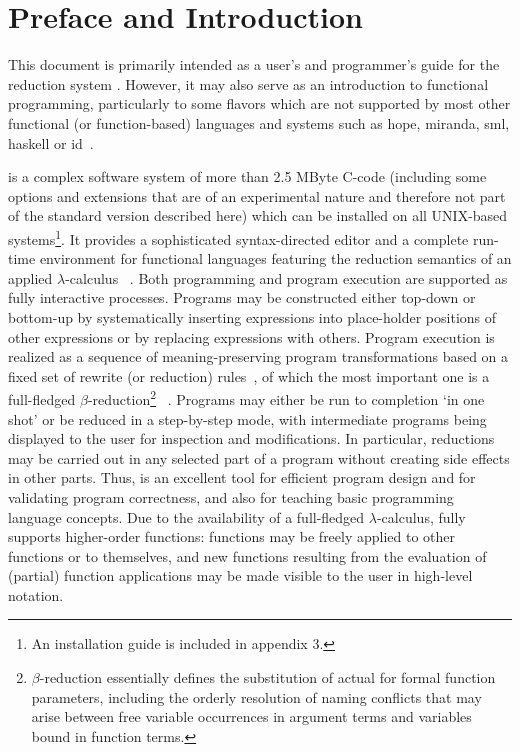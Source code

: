 \section{Preface and Introduction}

This document is primarily intended as a user's and programmer's guide 
for the reduction system \pired.
However, it may also serve
as an introduction to {\mys functional programming}, particularly
to some flavors which are not supported by most other {\mys functional}
(or function-based) {\mys languages} and
systems such as {\sc hope, miranda, sml, haskell} or {\sc id}~\cite{burs80,turn85a,turn86,harp86,harp88a,huda88,nikh88}. 

\pired is a complex software system of more than 2.5 MByte C-code (including some options and extensions that are of an experimental nature and therefore not part of the standard version described here) which can be
installed on all UNIX-based systems\footnote{An installation guide is included in appendix 3.}. It provides a sophisticated
{\mys syntax-directed editor} and a complete run-time environment
 for functional
 languages featuring the {\mys reduction semantics} of an applied
{\mys $\lambda$-calculus} ~\cite{chur41,bar81,hind86}. Both programming and program execution are
supported as fully interactive processes. Programs may be constructed either
top-down or bottom-up by systematically inserting expressions
into place-holder positions of other expressions or by replacing
expressions with others. Program execution is realized as a sequence of
{\mys meaning-preserving} program {\mys transformations} based on a fixed set of
{\mys rewrite} (or {\mys reduction}) {\mys rules}~, of which 
the most important one is a 
full-fledged {\mys $\beta$-reduction}\footnote{$\beta$-reduction 
essentially defines the substitution of actual for formal function
 parameters, including the orderly resolution of {\mys naming conflicts}
that may arise between free variable occurrences in argument terms
and variables bound in function terms.}
~\cite{berk75,berk82b}. Programs  may either be run to completion `in
one shot' or be reduced
in a step-by-step mode, with intermediate programs being displayed to the user for
inspection and modifications. In particular, reductions
may be carried out in any selected part of a program without creating
side effects in other parts. Thus, \pired is
 an excellent
tool for efficient program design and for validating program correctness, and also for teaching basic programming language concepts.
Due to the availability of a full-fledged $\lambda$-calculus, \pired
fully supports {\mys higher-order functions}: functions may be 
freely applied to other functions or to themselves, and
new functions resulting from the evaluation of (partial) function applications 
may be made visible to the user in high-level notation.

